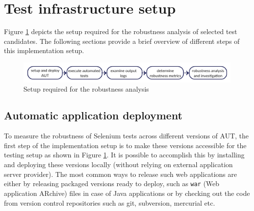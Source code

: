 \section{Test infrastructure setup}
\label{infra}

Figure \ref{fig:thesisoverview2} depicts the setup required for the robustness analysis of selected test candidates. The following sections provide a brief overview of different steps of this implementation setup.  
\begin{figure}[h]
	\centering	\includegraphics[width=\textwidth]{./Figures/thesisoverviewsmall.jpg}
	\caption{Setup required for the robustness analysis}
	\label{fig:thesisoverview2}
\end{figure} 

\subsection{Automatic application deployment}
\label{sec:autoDeployment}

To measure the robustness of Selenium tests across different versions of AUT, the first step of the implementation setup is to make these versions accessible for the testing setup as shown in Figure \ref{fig:thesisoverview2}. It is possible to accomplish this by installing and deploying these versions locally (without relying on external application server provider). The most common ways to release such web applications are either by releasing packaged versions ready to deploy, such as \texttt{war} (Web application ARchive) files in case of Java applications or by checking out the code from version control repositories such as git, subversion, mercurial etc.

